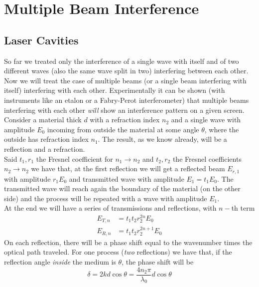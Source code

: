 \documentclass[../electromagnetism.tex]{subfiles}
\begin{document}
\section{Multiple Beam Interference}
\subsection{Laser Cavities}
So far we treated only the interference of a single wave with itself and of two different waves (also the same wave split in two) interfering between each other.\\
Now we will treat the case of multiple beams (or a single beam interfering with itself) interfering with each other. Experimentally it can be shown (with instruments like an etalon or a Fabry-Perot interferometer) that multiple beams interfering with each other \textit{will} show an interference pattern on a given screen.\\
Consider a material thick $d$ with a refraction index $n_2$ and a single wave with amplitude $E_0$ incoming from outside the material at some angle $\theta$, where the outside has refraction index $n_1$. The result, as we know already, will be a reflection and a refraction.\\
Said $t_1, r_1$ the Fresnel coefficient for $n_1\to n_2$ and $t_2, r_2$ the Fresnel coefficients $n_2\to n_2$ we have that, at the first reflection we will get a reflected beam $E_{r,1}$ with amplitude $r_1E_0$ and transmitted wave with amplitude $E_1=t_1E_0$. The transmitted wave will reach again the boundary of the material (on the other side) and the process will be repeated with a wave with amplitude $E_1$.\\
At the end we will have a series of transmissions and reflections, with $n-$th term 
\begin{equation}
	\begin{aligned}
		E_{T, n}&= t_1t_2r^{2n}_2E_0\\
		E_{R, n}&= t_1t_2r^{2n+1}_2E_0
	\end{aligned}
	\label{eq:nthterm.mbi}
\end{equation}
On each reflection, there will be a phase shift equal to the wavenumber times the optical path traveled. For one process (\textit{two} reflections) we have that, if the reflection angle \textit{inside} the medium is $\theta$, the phase shift will be
\begin{equation}
	\delta=2kd\cos\theta=\frac{4n_2\pi}{\lambda_0}d\cos\theta
	\label{eq:phaseshift.mbi}
\end{equation}
\end{document}
